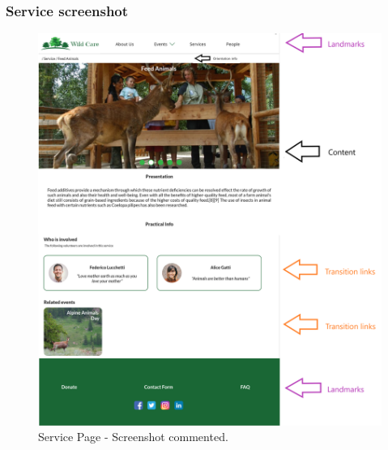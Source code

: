 \subsubsection{Service screenshot}
\begin{figure}[h!]
	\centering
	\begin{minipage}[b]{1\textwidth}
    		\includegraphics[width=\textwidth]{./assets/mockups/servicedetails_commented.png}
		\caption{Service Page - Screenshot commented.}
	\end{minipage}
\end{figure}
\FloatBarrier
